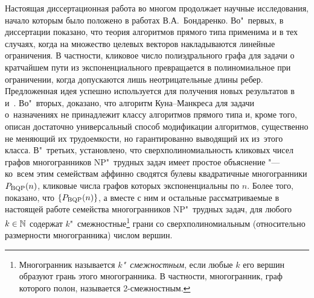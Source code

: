 Настоящая диссертационная работа во многом продолжает научные исследования, начало которым было положено в работах В.А.~Бондаренко. Во"~первых, в диссертации показано, что теория алгоритмов прямого типа применима и в тех случаях, когда на множество целевых векторов накладываются линейные ограничения.
В частности, кликовое число полиэдрального графа для задачи о кратчайшем пути из экспоненциального превращается в полиномиальное при ограничении, когда допускаются лишь неотрицательные длины ребер.
Предложенная идея успешно используется для получения новых результатов в~\cite{Nikolaev:2016} и~\cite{Shovgenov:2017}. Во"~вторых, доказано, что алгоритм Куна--Манкреса для задачи о~назначениях не принадлежит классу алгоритмов прямого типа и, кроме того, описан достаточно универсальный способ модификации алгоритмов, существенно не меняющий их трудоемкости, но гарантированно выводящий их из~этого класса. В"~третьих, установлено, что сверхполиномиальность кликовых чисел графов многогранников NP"~трудных задач имеет простое объяснение "--- ко~всем этим семействам аффинно сводятся булевы квадратичные многогранники $P_{\textup{BQP}}(n)$, кликовые числа графов которых экспоненциальны по $n$.
Более того, показано, что $\{P_{\textup{BQP}}(n)\}$, а вместе с ним и остальные рассматриваемые в настоящей работе семейства многогранников NP"~трудных задач, для любого $k \in \mathbb{N}$ содержат $k$"~смежностные\footnote{Многогранник называется \emph{$k$"~смежностным}, если любые $k$ его вершин образуют грань этого многогранника. В частности, многогранник, граф которого полон, называется 2-смежностным.} грани со сверхполиномиальным (относительно размерности многогранника) числом вершин.



